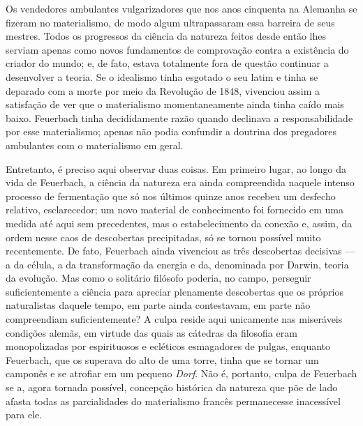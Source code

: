 Os vendedores ambulantes vulgarizadores que nos anos cinquenta na
Alemanha se fizeram no materialismo, de modo algum ultrapassaram essa
barreira de seus mestres. Todos os progressos da ciência da natureza
feitos desde então lhes serviam apenas como novos fundamentos de
comprovação contra a existência do criador do mundo; e, de fato, estava
totalmente fora de questão continuar a desenvolver a teoria. Se o
idealismo tinha esgotado o seu latim e tinha se deparado com a morte por
meio da Revolução de 1848, vivenciou assim a satisfação de ver que o
materialismo momentaneamente ainda tinha caído mais
baixo. Feuerbach tinha
decididamente razão quando declinava a responsabilidade por esse
materialismo; apenas não podia confundir a doutrina dos pregadores
ambulantes com o materialismo em geral.

Entretanto, é preciso aqui observar duas coisas. Em primeiro lugar, ao
longo da vida
de Feuerbach,
a ciência da natureza era ainda compreendida naquele intenso processo de
fermentação que só nos últimos quinze anos recebeu um desfecho relativo,
esclarecedor; um novo material de conhecimento foi fornecido em uma
medida até aqui sem precedentes, mas o estabelecimento
da conexão e, assim, da ordem nesse caos de 
descobertas precipitadas, só se tornou possível muito recentemente. De
fato,
 Feuerbach ainda
vivenciou as três descobertas decisivas --- a da célula, a da
transformação da energia e da, denominada
por Darwin,
teoria da evolução. Mas como o solitário
filósofo poderia, no campo, perseguir suficientemente a ciência para
apreciar plenamente descobertas que os próprios naturalistas daquele
tempo, em parte ainda contestavam, em parte não compreendiam
suficientemente? A culpa reside aqui unicamente nas miseráveis condições
alemãs, em virtude das quais as cátedras da filosofia eram monopolizadas
por espirituosos e ecléticos esmagadores de pulgas,
enquanto Feuerbach,
que os superava do alto de uma torre, tinha que se tornar um camponês e
se atrofiar em um pequeno \emph{Dorf}. Não é, portanto, culpa
de Feuerbach
se a, agora tornada possível, concepção histórica da natureza que põe de
lado \textbar{} afasta \textbar{} todas as parcialidades do materialismo francês
permanecesse inacessível para ele.

